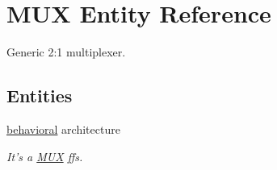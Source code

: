 \hypertarget{class_m_u_x}{\section{\-M\-U\-X \-Entity \-Reference}
\label{class_m_u_x}
}


\-Generic 2\-:1 multiplexer.  


\subsection*{\-Entities}
\begin{DoxyCompactItemize}
\item 
\hyperlink{class_m_u_x_1_1behavioral}{behavioral} architecture
\begin{DoxyCompactList}\small\item\em \-It's a \hyperlink{class_m_u_x}{\-M\-U\-X} ffs. \end{DoxyCompactList}\end{DoxyCompactItemize}
\*
\*
